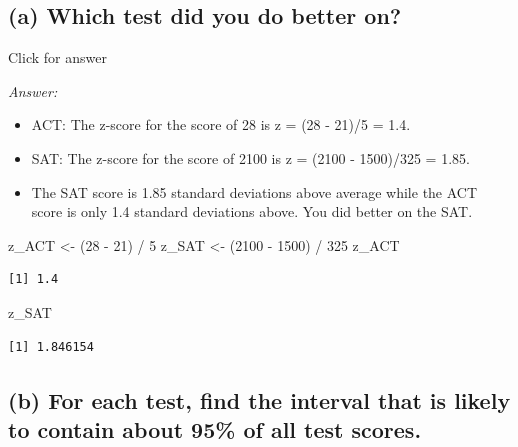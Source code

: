 \documentclass[
]{book}
\newenvironment{Shaded}{\begin{snugshade}}{\end{snugshade}}
\newcommand{\DecValTok}[1]{\textcolor[rgb]{0.00,0.00,0.81}{#1}}
\newcommand{\NormalTok}[1]{#1}
\newcommand{\OtherTok}[1]{\textcolor[rgb]{0.56,0.35,0.01}{#1}}
\newcommand{\SpecialCharTok}[1]{\textcolor[rgb]{0.00,0.00,0.00}{#1}}
\providecommand{\tightlist}{%
  \setlength{\itemsep}{0pt}\setlength{\parskip}{0pt}}
\begin{document}
\hypertarget{a-which-test-did-you-do-better-on}{%
\subsection{(a) Which test did you do better on?}\label{a-which-test-did-you-do-better-on}}

Click for answer

\emph{Answer:}

\begin{itemize}
\tightlist
\item
  ACT: The z-score for the score of 28 is z = (28 - 21)/5 = 1.4.
\item
  SAT: The z-score for the score of 2100 is z = (2100 - 1500)/325 = 1.85.
\item
  The SAT score is 1.85 standard deviations above average while the ACT score is only 1.4 standard
  deviations above. You did better on the SAT.
\end{itemize}

\begin{Shaded}
\begin{Highlighting}[]
\NormalTok{z\_ACT }\OtherTok{\textless{}{-}}\NormalTok{ (}\DecValTok{28} \SpecialCharTok{{-}} \DecValTok{21}\NormalTok{) }\SpecialCharTok{/} \DecValTok{5}
\NormalTok{z\_SAT }\OtherTok{\textless{}{-}}\NormalTok{ (}\DecValTok{2100} \SpecialCharTok{{-}} \DecValTok{1500}\NormalTok{) }\SpecialCharTok{/} \DecValTok{325}
\NormalTok{z\_ACT}
\end{Highlighting}
\end{Shaded}

\begin{verbatim}
[1] 1.4
\end{verbatim}

\begin{Shaded}
\begin{Highlighting}[]
\NormalTok{z\_SAT}
\end{Highlighting}
\end{Shaded}

\begin{verbatim}
[1] 1.846154
\end{verbatim}

\hypertarget{b-for-each-test-find-the-interval-that-is-likely-to-contain-about-95-of-all-test-scores.}{%
\subsection{(b) For each test, find the interval that is likely to contain about 95\% of all test scores.}\label{b-for-each-test-find-the-interval-that-is-likely-to-contain-about-95-of-all-test-scores.}}
\end{document}

